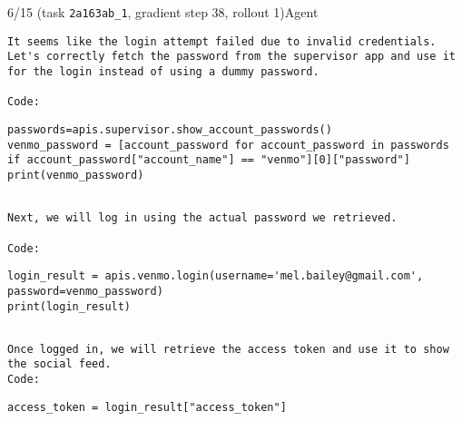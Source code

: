 \begin{minipage}{0.95\linewidth}
\begin{assistant_message_box}{{6/15 (task \texttt{2a163ab\_1}, gradient step 38, rollout 1)\hfill Agent}}
\scriptsize
\begin{Verbatim}[breaklines]
It seems like the login attempt failed due to invalid credentials. Let's correctly fetch the password from the supervisor app and use it for the login instead of using a dummy password.

Code:
\end{Verbatim}
\begin{tcolorbox}[colback=codebgcolor,boxrule=0pt]\begin{Verbatim}[breaklines]
passwords=apis.supervisor.show_account_passwords()
venmo_password = [account_password for account_password in passwords if account_password["account_name"] == "venmo"][0]["password"]
print(venmo_password)

\end{Verbatim}
\end{tcolorbox}\begin{Verbatim}[breaklines]

Next, we will log in using the actual password we retrieved.
 
Code:
\end{Verbatim}
\begin{tcolorbox}[colback=codebgcolor,boxrule=0pt]\begin{Verbatim}[breaklines]
login_result = apis.venmo.login(username='mel.bailey@gmail.com', password=venmo_password)
print(login_result)

\end{Verbatim}
\end{tcolorbox}\begin{Verbatim}[breaklines]

Once logged in, we will retrieve the access token and use it to show the social feed.
Code:
\end{Verbatim}
\begin{tcolorbox}[colback=codebgcolor,boxrule=0pt]\begin{Verbatim}[breaklines]
access_token = login_result["access_token"]
\end{Verbatim}
\end{tcolorbox}\end{assistant_message_box}
\end{minipage}

